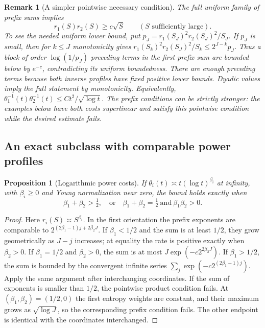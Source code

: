 \documentclass[11pt]{article}
\newtheorem{proposition}[theorem]{Proposition}
\newtheorem{remark}[theorem]{Remark}
\numberwithin{equation}{section}
\begin{document}
\begin{remark}[A simpler pointwise necessary condition]
\label{pair:rem:pointwise}
The full uniform family of prefix sums implies
\[
 r_1(S)r_2(S)\ge c\sqrt S\qquad(S\text{ sufficiently large}).
 \tag{P9}\label{pair:eq:product}
\]
To see the needed uniform lower bound, put
$p_J=r_1(S_J)^2r_2(S_J)^2/S_J$. If $p_J$ is small, then for
$k\le J$ monotonicity gives
$r_1(S_k)^2r_2(S_J)^2/S_k\le2^{J-k}p_J$. Thus a block of
order $\log(1/p_J)$ preceding terms in the first prefix sum are bounded
below by $e^{-c}$, contradicting its uniform boundedness. There are
enough preceding terms because both inverse profiles have fixed positive
lower bounds. Dyadic values imply the full statement by monotonicity.
Equivalently,
\(\theta_1^{-1}(t)\theta_2^{-1}(t)
 \le C t^2/\sqrt{\log t}\).  The prefix conditions can be strictly
stronger: the examples below have both costs superlinear and satisfy
this pointwise condition while the desired estimate fails.
\end{remark}

\subsection{An exact subclass with comparable power profiles}

\begin{proposition}[Logarithmic power costs]\label{pair:prop:log-powers}
If $\theta_i(t)\asymp t(\log t)^{\beta_i}$ at infinity, with
$\beta_i\ge0$ and Young normalization near zero, the bound holds
exactly when
\[
 \beta_1+\beta_2>\tfrac12,
 \quad\text{or}\quad
 \beta_1+\beta_2=\tfrac12\ \text{and}\ \beta_1\beta_2>0.
\]
\end{proposition}
\begin{proof}
Here $r_i(S)\asymp S^{\beta_i}$. In the first orientation the
prefix exponents are comparable to
$2^{(2\beta_1-1)j+2\beta_2J}$.
If $\beta_1<1/2$ and the sum is at least $1/2$, they grow
geometrically as $J-j$ increases; at equality the rate is positive
exactly when $\beta_2>0$. If $\beta_1=1/2$ and $\beta_2>0$,
the sum is at most $J\exp(-c2^{2\beta_2J})$.
If $\beta_1>1/2$, the sum is bounded by the convergent infinite
series $\sum_j\exp(-c2^{(2\beta_1-1)j})$.
Apply the same argument after interchanging coordinates.
If the sum of exponents is smaller than $1/2$, the pointwise product
condition fails. At $(\beta_1,\beta_2)=(1/2,0)$ the first entropy
weights are constant, and their maximum grows as $\sqrt{\log J}$,
so the corresponding prefix condition fails. The other endpoint is
identical with the coordinates interchanged.
\end{proof}
\end{document}
